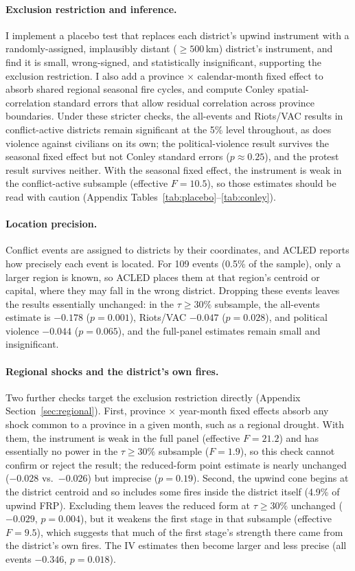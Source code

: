 \documentclass[12pt]{article}
\begin{document}
\paragraph{Exclusion restriction and inference.} I implement a placebo test that replaces each district's upwind instrument with a randomly-assigned, implausibly distant ($\geq 500$\,km) district's instrument, and find it is small, wrong-signed, and statistically insignificant, supporting the exclusion restriction. I also add a province $\times$ calendar-month fixed effect to absorb shared regional seasonal fire cycles, and compute Conley spatial-correlation standard errors that allow residual correlation across province boundaries. Under these stricter checks, the all-events and Riots/VAC results in conflict-active districts remain significant at the 5\% level throughout, as does violence against civilians on its own; the political-violence result survives the seasonal fixed effect but not Conley standard errors ($p \approx 0.25$), and the protest result survives neither. With the seasonal fixed effect, the instrument is weak in the conflict-active subsample (effective $F = 10.5$), so those estimates should be read with caution (Appendix Tables~\ref{tab:placebo}--\ref{tab:conley}).

\paragraph{Location precision.} Conflict events are assigned to districts by their coordinates, and ACLED reports how precisely each event is located. For 109 events (0.5\% of the sample), only a larger region is known, so ACLED places them at that region's centroid or capital, where they may fall in the wrong district. Dropping these events leaves the results essentially unchanged: in the $\tau \geq 30\%$ subsample, the all-events estimate is $-0.178$ ($p=0.001$), Riots/VAC $-0.047$ ($p=0.028$), and political violence $-0.044$ ($p=0.065$), and the full-panel estimates remain small and insignificant.

\paragraph{Regional shocks and the district's own fires.} Two further checks target the exclusion restriction directly (Appendix Section~\ref{sec:regional}). First, province $\times$ year-month fixed effects absorb any shock common to a province in a given month, such as a regional drought. With them, the instrument is weak in the full panel (effective $F = 21.2$) and has essentially no power in the $\tau \geq 30\%$ subsample ($F = 1.9$), so this check cannot confirm or reject the result; the reduced-form point estimate is nearly unchanged ($-0.028$ vs.\ $-0.026$) but imprecise ($p=0.19$). Second, the upwind cone begins at the district centroid and so includes some fires inside the district itself (4.9\% of upwind FRP). Excluding them leaves the reduced form at $\tau \geq 30\%$ unchanged ($-0.029$, $p=0.004$), but it weakens the first stage in that subsample (effective $F = 9.5$), which suggests that much of the first stage's strength there came from the district's own fires. The IV estimates then become larger and less precise (all events $-0.346$, $p=0.018$).
\end{document}
